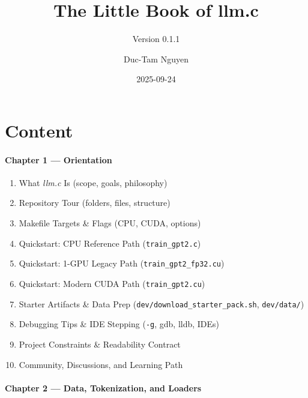 \documentclass[
  letterpaper,
  DIV=11,
  numbers=noendperiod]{scrreprt}
\title{The Little Book of llm.c}
\subtitle{Version 0.1.1}
\author{Duc-Tam Nguyen}
\date{2025-09-24}
\providecommand{\tightlist}{%
  \setlength{\itemsep}{0pt}\setlength{\parskip}{0pt}}
\renewcommand*\contentsname{Table of contents}
\newcommand\contentsname{Table of contents}
\begin{document}
\maketitle

\renewcommand*\contentsname{Table of contents}
{
\hypersetup{linkcolor=}
\setcounter{tocdepth}{2}
\tableofcontents
}


\chapter{Content}\label{content}

\subsubsection{Chapter 1 --- Orientation}\label{chapter-1-orientation}

\begin{enumerate}
\def\labelenumi{\arabic{enumi}.}
\tightlist
\item
  What \emph{llm.c} Is (scope, goals, philosophy)
\item
  Repository Tour (folders, files, structure)
\item
  Makefile Targets \& Flags (CPU, CUDA, options)
\item
  Quickstart: CPU Reference Path (\texttt{train\_gpt2.c})
\item
  Quickstart: 1-GPU Legacy Path (\texttt{train\_gpt2\_fp32.cu})
\item
  Quickstart: Modern CUDA Path (\texttt{train\_gpt2.cu})
\item
  Starter Artifacts \& Data Prep
  (\texttt{dev/download\_starter\_pack.sh}, \texttt{dev/data/})
\item
  Debugging Tips \& IDE Stepping (\texttt{-g}, gdb, lldb, IDEs)
\item
  Project Constraints \& Readability Contract
\item
  Community, Discussions, and Learning Path
\end{enumerate}

\subsubsection{Chapter 2 --- Data, Tokenization, and
Loaders}\label{chapter-2-data-tokenization-and-loaders}
\end{document}
